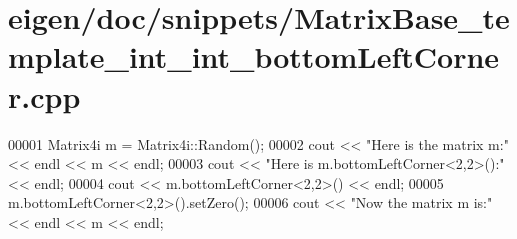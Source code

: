 \hypertarget{eigen_2doc_2snippets_2_matrix_base__template__int__int__bottom_left_corner_8cpp_source}{}\section{eigen/doc/snippets/\+Matrix\+Base\+\_\+template\+\_\+int\+\_\+int\+\_\+bottom\+Left\+Corner.cpp}
\label{eigen_2doc_2snippets_2_matrix_base__template__int__int__bottom_left_corner_8cpp_source}

\begin{DoxyCode}
00001 Matrix4i m = Matrix4i::Random();
00002 cout << \textcolor{stringliteral}{"Here is the matrix m:"} << endl << m << endl;
00003 cout << \textcolor{stringliteral}{"Here is m.bottomLeftCorner<2,2>():"} << endl;
00004 cout << m.bottomLeftCorner<2,2>() << endl;
00005 m.bottomLeftCorner<2,2>().setZero();
00006 cout << \textcolor{stringliteral}{"Now the matrix m is:"} << endl << m << endl;
\end{DoxyCode}
